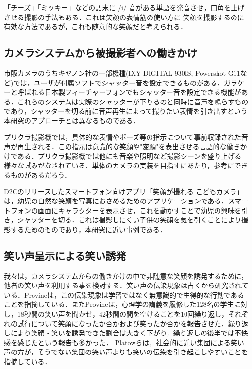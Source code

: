 \documentclass[submit,techreq]{ec2014}
\begin{document}
「チーズ」「ミッキー」などの語末に /i/ 音がある単語を発音させ，口角を上げさせる撮影の手法もある．これは笑顔の表情筋の使い方に
笑顔を撮影するのに有効な方法であるが，これも随意的な笑顔だと考えられる．

\subsection{カメラシステムから被撮影者への働きかけ}



市販カメラのうちキヤノン社の一部機種(IXY DIGITAL 930IS, Powershot G11など)では，ユーザが付属ソフトでシャッター音を設定できるものがある\cite{PowershotG1X}．ガラケーと呼ばれる日本製フィーチャーフォンでもシャッター音を設定できる機能がある．これらのシステムは実際のシャッターが下りるのと同時に音声を鳴らすものであり，シャッターを切る前に音声再生によって撮りたい表情を引き出すという本研究のアプローチとは異なるものである．

プリクラ撮影機では，具体的な表情やポーズ等の指示について事前収録された音声が再生される．この指示は意識的な笑顔や"変顔"を表出させる言語的な働きかけである．プリクラ撮影機では他にも音楽や照明など撮影シーンを盛り上げる様々な試みがなされている．単体のカメラの実装を目指すにあたり，参考にできるものがあるだろう．

D2Cのリリースしたスマートフォン向けアプリ「笑顔が撮れる こどもカメラ」は，幼児の自然な笑顔を写真におさめるためのアプリケーションである\cite{kodomocamera}．スマートフォンの画面にキャラクターを表示させ，これを動かすことで幼児の興味を引き，シャッターを切る．これは撮影しにくい子供の笑顔を気を引くことにより撮影するためのものであり，本研究に近い事例である．



\subsection{笑い声呈示による笑い誘発}

我々は，カメラシステムからの働きかけの中で非随意な笑顔を誘発するために，他者の笑い声を利用する事を検討する．笑い声の伝染現象は古くから研究されている．Provineは，この伝染現象は学習ではなく無意識的で生得的な行動であることを指摘している\cite{provine1996laughter}．またProvineは，心理学の講義を履修した128名の学生に対し，18秒間の笑い声を聞かせ，42秒間の間を空けることを10回繰り返し，それぞれの試行について笑顔になったか否かおよび笑ったか否かを報告させた\cite{provine1992contagious}．繰り返しにより笑顔・笑いを誘発できた割合は大きく下がり，繰り返しの後半では不快感を感じたという報告も多かった． Platowらは，社会的に近い集団による笑い声の方が，そうでない集団の笑い声よりも笑いの伝染を引き起こしやすいことを指摘している\cite{platow41n}．
\end{document}
